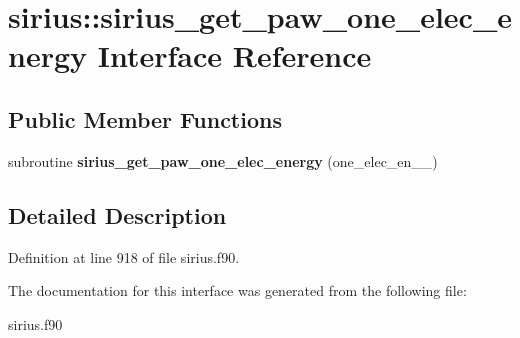 \hypertarget{interfacesirius_1_1sirius__get__paw__one__elec__energy}{}\section{sirius\+:\+:sirius\+\_\+get\+\_\+paw\+\_\+one\+\_\+elec\+\_\+energy Interface Reference}
\label{interfacesirius_1_1sirius__get__paw__one__elec__energy}
\subsection*{Public Member Functions}
\begin{DoxyCompactItemize}
\item 
\hypertarget{interfacesirius_1_1sirius__get__paw__one__elec__energy_afb379ce3a19e7609a7c56083e050fbf2}{}subroutine {\bfseries sirius\+\_\+get\+\_\+paw\+\_\+one\+\_\+elec\+\_\+energy} (one\+\_\+elec\+\_\+en\+\_\+\+\_\+)\label{interfacesirius_1_1sirius__get__paw__one__elec__energy_afb379ce3a19e7609a7c56083e050fbf2}

\end{DoxyCompactItemize}


\subsection{Detailed Description}


Definition at line 918 of file sirius.\+f90.



The documentation for this interface was generated from the following file\+:\begin{DoxyCompactItemize}
\item 
sirius.\+f90\end{DoxyCompactItemize}

